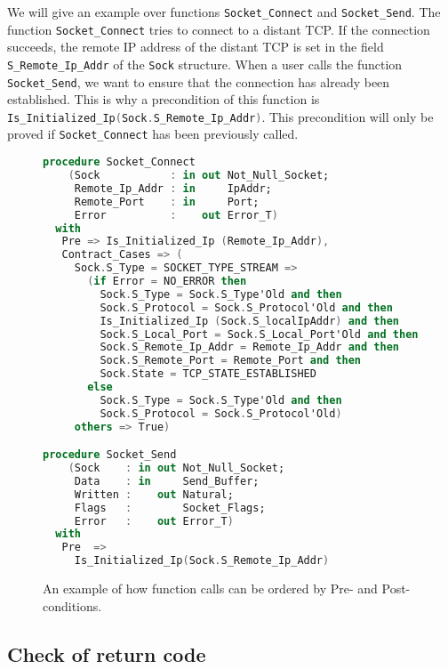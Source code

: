 \documentclass[a4paper, 10pt]{article}
\begin{document}
    We will give an example over functions \lstinline[language=Ada]{Socket_Connect} and
    \lstinline[language=Ada]{Socket_Send}. The function \lstinline[language=Ada]{Socket_Connect}
    tries to connect to a distant TCP. If the connection succeeds, the remote IP address of the distant
    TCP is set in the field \lstinline[language=Ada]{S_Remote_Ip_Addr} of the \lstinline[language=Ada]{Sock}
    structure. When a user calls the function \lstinline[language=Ada]{Socket_Send}, we want to ensure that
    the connection has already been established. This is why a precondition of this function is
    \lstinline[language=Ada]{Is_Initialized_Ip(Sock.S_Remote_Ip_Addr)}. This precondition will only
    be proved if \lstinline[language=Ada]{Socket_Connect} has been previously called.


    \begin{figure}
        \begin{lstlisting}[language=Ada]
procedure Socket_Connect
    (Sock           : in out Not_Null_Socket;
     Remote_Ip_Addr : in     IpAddr;
     Remote_Port    : in     Port;
     Error          :    out Error_T)
  with
   Pre => Is_Initialized_Ip (Remote_Ip_Addr),
   Contract_Cases => (
     Sock.S_Type = SOCKET_TYPE_STREAM =>
       (if Error = NO_ERROR then
         Sock.S_Type = Sock.S_Type'Old and then
         Sock.S_Protocol = Sock.S_Protocol'Old and then
         Is_Initialized_Ip (Sock.S_localIpAddr) and then
         Sock.S_Local_Port = Sock.S_Local_Port'Old and then
         Sock.S_Remote_Ip_Addr = Remote_Ip_Addr and then
         Sock.S_Remote_Port = Remote_Port and then
         Sock.State = TCP_STATE_ESTABLISHED
       else
         Sock.S_Type = Sock.S_Type'Old and then
         Sock.S_Protocol = Sock.S_Protocol'Old)
     others => True)

procedure Socket_Send
    (Sock    : in out Not_Null_Socket;
     Data    : in     Send_Buffer;
     Written :    out Natural;
     Flags   :        Socket_Flags;
     Error   :    out Error_T)
  with
   Pre  =>
     Is_Initialized_Ip(Sock.S_Remote_Ip_Addr)
        \end{lstlisting}
        \caption{An example of how function calls can be ordered by Pre- and Post-conditions.}
        \label{code:FunOrdered}
    \end{figure}

    \subsection{Check of return code}
\end{document}
